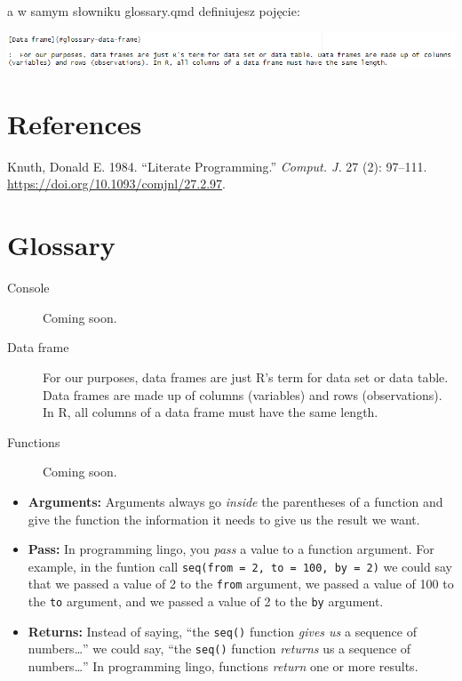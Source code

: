 \documentclass[
  a4paper,
  DIV=11,
  numbers=noendperiod,
  oneside,
  open=any]{scrreprt}
\newlength{\cslhangindent}
\newenvironment{CSLReferences}[2] %
 {\begin{list}{}{%
  \setlength{\itemindent}{0pt}
  \setlength{\leftmargin}{0pt}
  \setlength{\parsep}{0pt}
  \ifodd #1
   \setlength{\leftmargin}{\cslhangindent}
   \setlength{\itemindent}{-1\cslhangindent}
  \fi
  \setlength{\itemsep}{#2\baselineskip}}}
 {\end{list}}
\begin{document}
a w samym słowniku glossary.qmd definiujesz pojęcie:

\includegraphics{images/_format_glossary2.png}


\chapter*{References}\label{references}


\label{refs}
\begin{CSLReferences}{1}{0}
Knuth, Donald E. 1984. {``Literate Programming.''} \emph{Comput. J.} 27
(2): 97--111. \url{https://doi.org/10.1093/comjnl/27.2.97}.

\end{CSLReferences}

\cleardoublepage
{}
{}
\appendix

\chapter{Glossary}\label{sec-glossary}

\begin{description}
\item[\label{glossary-console}{Console}]
Coming soon.
\item[\label{glossary-data-frame}{Data frame}]
For our purposes, data frames are just R's term for data set or data
table. Data frames are made up of columns (variables) and rows
(observations). In R, all columns of a data frame must have the same
length.
\item[\label{glossary-functions}{Functions}]
Coming soon.
\end{description}

\begin{itemize}
\item
  \textbf{Arguments:} Arguments always go \emph{inside} the parentheses
  of a function and give the function the information it needs to give
  us the result we want.
\item
  \textbf{Pass:} In programming lingo, you \emph{pass} a value to a
  function argument. For example, in the funtion call
  \texttt{seq(from\ =\ 2,\ to\ =\ 100,\ by\ =\ 2)} we could say that we
  passed a value of 2 to the \texttt{from} argument, we passed a value
  of 100 to the \texttt{to} argument, and we passed a value of 2 to the
  \texttt{by} argument.
\item
  \textbf{Returns:} Instead of saying, ``the \texttt{seq()} function
  \emph{gives us} a sequence of numbers\ldots{}'' we could say, ``the
  \texttt{seq()} function \emph{returns} us a sequence of
  numbers\ldots{}'' In programming lingo, functions \emph{return} one or
  more results.
\end{itemize}
\end{document}
